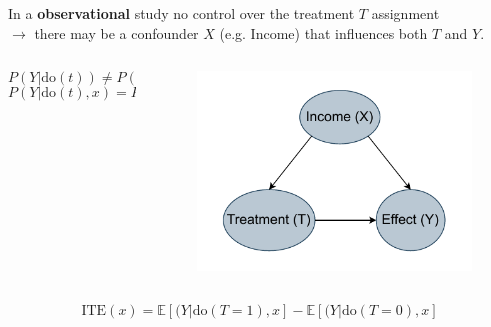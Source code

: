 \documentclass[10pt]{beamer}
\begin{document}
\begin{frame}{}
  In a \textbf{observational} study \alert{no control} over the treatment $T$ assignment\\
    $\rightarrow$ there may be a confounder $X$ (e.g. Income) that influences both $T$ and $Y$.
  \begin{columns}
    \begin{column}{0.5\textwidth}
      \begin{equation*}
        P(Y|\text{do}(t))\ne P(Y|t)
      \end{equation*}
      \begin{equation*}
        P(Y|\text{do}(t),x) =P(Y|t,x)
      \end{equation*}
    \end{column}
    \begin{column}{0.5\textwidth}
      \begin{figure}
        \centering
        \includegraphics[width=\textwidth]{images/unconfoundness.pdf}
      \end{figure}
    \end{column}
  \end{columns}

    \begin{equation*}
    \text{ITE}(x) = \mathbb{E}[(Y|\text{do}(T=1),x]-\mathbb{E}[(Y|\text{do}(T=0),x]
  \end{equation*}
\end{frame}
\end{document}
